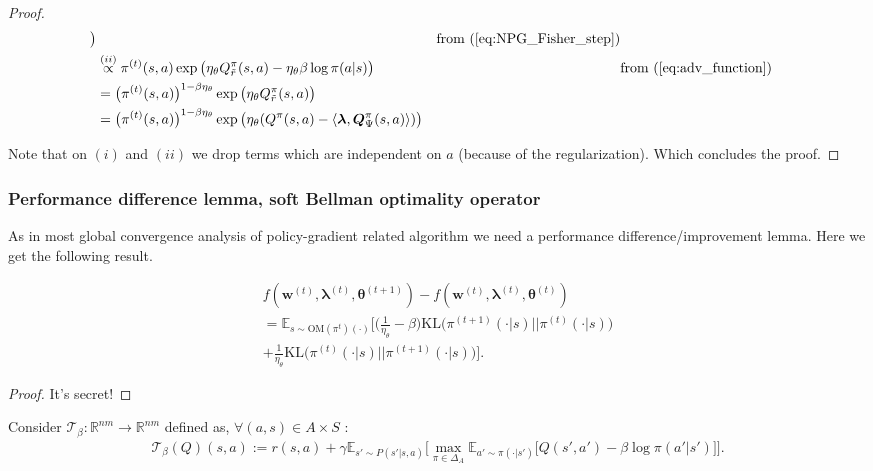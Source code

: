 \begin{proof}
\begin{align*}
    \big) && \text{from (\ref{eq:NPG_Fisher_step})} \\
    &\stackrel{(ii)}{\propto} \pi^{(t)}(s,a) \exp\big(
        \eta_\theta Q_{\tilde{r}}^\pi(s,a) 
        - \eta_\theta \beta \log \pi(a|s) 
    \big) && \text{from (\ref{eq:adv_function})} \\
    &= \bigl( \pi^{(t)}(s,a) \bigr)^{1-\beta \eta_\theta } \exp\big(
        \eta_\theta 
        Q_{\tilde{r}}^\pi(s,a) 
    \big) \\
    &= \bigl( \pi^{(t)}(s,a) \bigr)^{1-\beta \eta_\theta } \exp\big(
        \eta_\theta 
        (Q^\pi(s,a) - \langle \bm{\lambda}, \bm{Q}_\Psi^\pi(s,a) \rangle )
    \big) && \\
\end{align*}

Note that on $(i)$ and $(ii)$ we drop terms which are independent on $a$ (because of the regularization). Which concludes the proof.
\end{proof}

\subsubsection{Performance difference lemma, soft Bellman optimality operator}
As in most global convergence analysis of policy-gradient related algorithm we need a performance difference/improvement lemma. Here we get the following result.
\begin{lemma}
    \begin{align*}
    f(\bm{w}^{(t)},\bm{\lambda}^{(t)},\bm{\theta}^{(t+1)}) 
    - f(\bm{w}^{(t)},\bm{\lambda}^{(t)},\bm{\theta}^{(t)}) \\
   = \mathbb{E}_{s \sim \text{OM}(\pi^{t})(\cdot)}
   \Bigg[ 
        \Big(
            \frac{1}{\eta_\theta} - \beta
        \Big)\text{KL}
        \Big(
            \pi^{(t+1)}(\cdot|s)
            \Big|\Big|
            \pi^{(t)}(\cdot|s)
        \Big)
        \\+ \frac{1}{\eta_\theta}
        \text{KL}
        \Big(
            \pi^{(t)}(\cdot|s)
            \Big|\Big|
            \pi^{(t+1)}(\cdot|s)
        \Big)
    \Bigg].
    \end{align*}
\end{lemma}

\begin{proof}
    It's secret!
\end{proof}


\begin{definition}
    Consider $\mathcal{T}_\beta:\mathbb{R}^{nm} \rightarrow \mathbb{R}^{nm}$ defined as, $\forall (a,s) \in A \times S$ :
    \begin{align*}
        \mathcal{T}_\beta(Q)(s,a) := r(s,a) 
        + \gamma \mathbb{E}_{s'\sim P(s'|s,a)} \Bigg[
            \max_{\pi \in \Delta_A}
            \mathbb{E}_{a'\sim \pi(\cdot|s')} \Big[
                Q(s',a') - \beta \log \pi(a'|s')
            \Big]
        \Bigg].
    \end{align*}
\end{definition}

